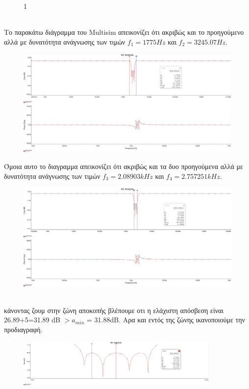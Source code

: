 \documentclass{article}
\begin{document}
{{\begin{figure}[h!]
1\end{figure} \\
Tο παρακάτω διάγραμμα του Multisim απεικονίζει ότι ακριβώς και το προηγούμενο αλλά με δυνατότητα ανάγνωσης των τιμών $f_1 = 1775Hz$ και $f_2 = 3245.07Hz$.
\begin{figure}[h!]
\centering
 	\advance\leftskip-1cm
  \includegraphics[width=140mm,scale=2]{thema3/multisim2a.jpg}
\end{figure} 
\clearpage
Όμοια αυτο το διαγραμμα απεικονίζει ότι ακριβώς και τα δυο προηγούμενα αλλά με δυνατότητα ανάγνωσης των τιμών $f_3 = 2.08903kHz$ και $f_4 = 2.757251kHz$.
 \\
\begin{figure}[h!]
\centering
 	\advance\leftskip-1cm
  \includegraphics[width=140mm,scale=2]{thema3/multisim3a.jpg}
\end{figure} \\
κάνοντας ζουμ στην ζώνη αποκοπής βλέπουμε οτι η ελάχιστη απόσβεση είναι 26.89+5=31.89 dB $> a_{min}$ = 31.88dB. Aρα και εντός της ζώνης ικανοποιούμε την προδιαγραφή.
\begin{figure}[h!]
\centering
 	\advance\leftskip-1cm
  \includegraphics[width=100mm,scale=2]{thema3/multisim4a.jpg}

\end{figure}}}
\end{document}
